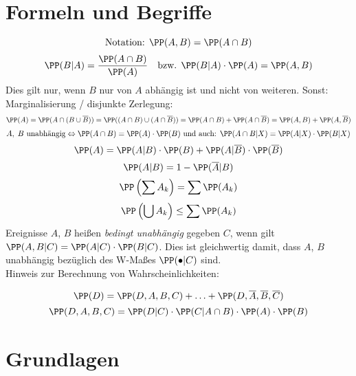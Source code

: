 \section{Formeln und Begriffe}
$$\text{Notation: } \PP(A,B)=\PP(A \cap B)$$
$$\PP(B|A)=\frac{\PP(A \cap B)}{\PP(A)} \quad \text{bzw. } \PP(B|A)\cdot \PP(A) = \PP(A,B)$$
Dies gilt nur, wenn $B$ nur von $A$ abhängig ist und nicht von weiteren. Sonst: Marginalisierung / disjunkte Zerlegung:
$$\PP(A) = \PP(A\cap (B \cup \overline{B}))=\PP((A \cap B) \cup (A \cap \overline{B}))=\PP(A \cap B) + \PP(A\cap \overline{B})=\PP(A,B)+\PP(A, \overline{B})$$
$$A, \;B \text{ unabhängig}\Leftrightarrow \PP(A \cap B)=\PP(A) \cdot \PP(B) \text{ und auch: }\PP(A \cap B | X)=\PP(A|X) \cdot \PP(B|X)$$
$$\PP(A) = \PP(A|B) \cdot \PP(B) + \PP(A|\overline{B}) \cdot \PP(\overline{B})$$
$$\PP(A|B)=1-\PP(\overline{A}|B)$$
$$\PP\left(\sum A_k\right) = \sum \PP(A_k)$$
$$\PP\left(\bigcup A_k\right) \leq \sum \PP(A_k)$$
Ereignisse $A$, $B$ heißen \emph{bedingt unabhängig} gegeben $C$, wenn gilt $\PP(A,B|C) = \PP(A|C) \cdot \PP(B|C)$. Dies ist gleichwertig damit, dass $A$, $B$ unabhängig bezüglich des W-Maßes $\PP(\bullet|C)$ sind.\\
Hinweis zur Berechnung von Wahrscheinlichkeiten:
\begin{center}
\end{center}
$$\PP(D) = \PP(D,A,B,C) + \ldots + \PP(D, \overline{A}, \overline{B}, \overline{C})$$
$$\PP(D,A,B,C) = \PP(D|C) \cdot \PP(C|A \cap B) \cdot \PP(A) \cdot \PP(B)$$
\section{Grundlagen}

